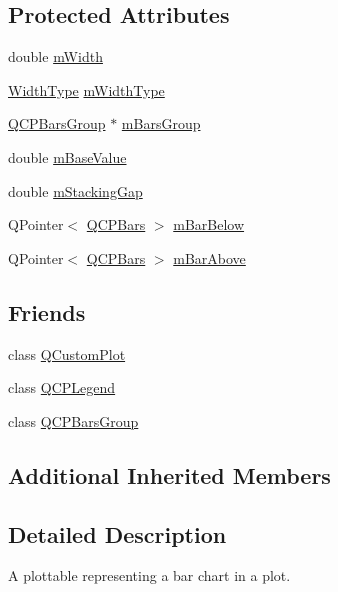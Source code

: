 \subsection*{Protected Attributes}
\begin{DoxyCompactItemize}
\item 
double \mbox{\hyperlink{class_q_c_p_bars_a7c4e0f2246f8133f48a9c3f24cf5b920}{m\+Width}}
\item 
\mbox{\hyperlink{class_q_c_p_bars_a65dbbf1ab41cbe993d71521096ed4649}{Width\+Type}} \mbox{\hyperlink{class_q_c_p_bars_a94dba1309496c7601d01e2c59715cbb3}{m\+Width\+Type}}
\item 
\mbox{\hyperlink{class_q_c_p_bars_group}{Q\+C\+P\+Bars\+Group}} $\ast$ \mbox{\hyperlink{class_q_c_p_bars_a9f59c255f3739182ca9744dff75beaa9}{m\+Bars\+Group}}
\item 
double \mbox{\hyperlink{class_q_c_p_bars_aa0515cf47fa6044cc28e59b1ae5ec759}{m\+Base\+Value}}
\item 
double \mbox{\hyperlink{class_q_c_p_bars_a2022ddbcf8b464a05d434700a666da18}{m\+Stacking\+Gap}}
\item 
Q\+Pointer$<$ \mbox{\hyperlink{class_q_c_p_bars}{Q\+C\+P\+Bars}} $>$ \mbox{\hyperlink{class_q_c_p_bars_ad51db970eed7e286f2753b0216fc56de}{m\+Bar\+Below}}
\item 
Q\+Pointer$<$ \mbox{\hyperlink{class_q_c_p_bars}{Q\+C\+P\+Bars}} $>$ \mbox{\hyperlink{class_q_c_p_bars_a0c1c46076c41a478dbb373cfd35929aa}{m\+Bar\+Above}}
\end{DoxyCompactItemize}
\subsection*{Friends}
\begin{DoxyCompactItemize}
\item 
class \mbox{\hyperlink{class_q_c_p_bars_a1cdf9df76adcfae45261690aa0ca2198}{Q\+Custom\+Plot}}
\item 
class \mbox{\hyperlink{class_q_c_p_bars_a8429035e7adfbd7f05805a6530ad5e3b}{Q\+C\+P\+Legend}}
\item 
class \mbox{\hyperlink{class_q_c_p_bars_ae1051b4d58a2786cb420367a586e2fee}{Q\+C\+P\+Bars\+Group}}
\end{DoxyCompactItemize}
\subsection*{Additional Inherited Members}


\subsection{Detailed Description}
A plottable representing a bar chart in a plot. 



